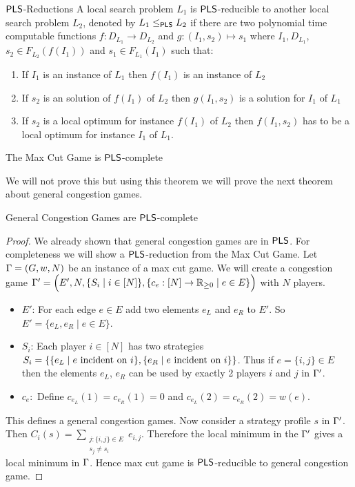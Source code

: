 \begin{definition}{$\operatorname{\mathsf{PLS}}$-Reductions}{}
	A local search problem $L_1$ is $\operatorname{\mathsf{PLS}}$-reducible to another local search problem $L_2$, denoted by $L_1\leq_{\operatorname{\mathsf{PLS}}}L_2$ if there are two polynomial time computable functions $f:D_{L_1}\to D_{L_2}$ and $g:(I_1,s_2)\mapsto s_1$ where $I_1, D_{L_1}$, $s_2\in F_{L_2}(f(I_1))$ and $s_1\in F_{L_1}(I_1)$ such that:\begin{enumerate}[label=(\roman*)]
		\item If $I_1$ is an instance of $L_1$ then $f(I_1)$ is an instance of $L_2$
		\item If $s_2$ is an solution of $f(I_1)$ of $L_2$ then $g(I_1,s_2)$ is a solution for $I_1$ of $L_1$
		\item If $s_2$ is a local optimum for instance $f(I_1)$ of $L_2$ then $f(I_1,s_2)$ has to be a local optimum for instance $I_1$ of $L_1$.
	\end{enumerate}
\end{definition}
\begin{Theorem}{}{}
	The Max Cut Game is $\operatorname{\mathsf{PLS}}$-complete
\end{Theorem}

We will not prove this but using this theorem we will prove the next theorem about general congestion games.

\begin{Theorem}{}{}
	General Congestion Games are $\operatorname{\mathsf{PLS}}$-complete
\end{Theorem}
\begin{proof}
	We already shown that general congestion games are in $\operatorname{\mathsf{PLS}}$. For completeness we will show a $\operatorname{\mathsf{PLS}}$-reduction from the Max Cut Game. Let $\Gamma=(G,w,N)$ be an instance of a max cut game. We will create a congestion game $\Gamma'=\Big(E',N, \{S_i\mid i\in[N]\}, \{c_e:[N]\to \mathbb{R}_{\geq 0}\mid e\in E\}\Big)$ with $N$ players.
	
	\begin{itemize}
		\item $E'$: For each edge $e\in E$ add two elements $e_L$ and $e_R$ to $E'$. So $E'=\{e_L,e_R\mid e\in E\}$.
		\item $S_i$: Each player $i\in[N]$ has two strategies $S_i=\left\{\{e_L\mid e\text{ incident on $i$}\}, \{e_R\mid e\text{ incident on $i$}\}\right\}$. Thus if $e=\{i,j\}\in E$ then the elements $e_L$, $e_R$ can be used by exactly 2 players $i$ and $j$ in $\Gamma'$.
		\item $c_e:$ Define $c_{e_L}(1)=c_{e_R}(1)=0$ and $c_{e_L}(2)=c_{e_R}(2)=w(e)$.
	\end{itemize}
This defines a general congestion games. Now consider a strategy profile $s$ in $\Gamma'$. Then $C_i(s)=\sum\limits_{\substack{j:\{i,j\}\in E\\ s_j\neq s_i}}e_{i,j}$. Therefore the local minimum in the $\Gamma'$ gives a local minimum in $\Gamma$. Hence max cut game is $\operatorname{\mathsf{PLS}}$-reducible to general congestion game.
\end{proof}